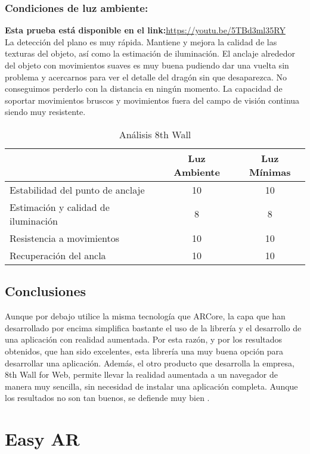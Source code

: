 \subsubsection{Condiciones de luz ambiente:}
\textbf{Esta prueba está disponible en el link:}\url{https://youtu.be/5TBd3ml35RY}\\

La detección del plano es muy rápida. Mantiene y mejora la calidad de las texturas del objeto, así como la estimación de iluminación. El anclaje alrededor del objeto con movimientos suaves es muy buena pudiendo dar una vuelta sin problema y acercarnos para ver el detalle del dragón sin que desaparezca. No conseguimos perderlo con la distancia en ningún momento. La capacidad de soportar movimientos bruscos y movimientos fuera del campo de visión continua siendo muy resistente.

\begin{table}[H]
    \centering
      \begin{tabular}{|l|c|c|}
    \hline
          & Luz Ambiente & Luz Mínimas \\
         \hline
        Estabilidad del punto de anclaje   &10 &10\\
        \hline
        Estimación y calidad de iluminación  &8 &8 \\
        \hline
        Resistencia a movimientos  &10 &10 \\
        \hline
        Recuperación del ancla  &10 &10 \\
      \hline
    \end{tabular}
    \caption{Análisis 8th Wall}
    \label{tab:T8thWall}
\end{table}
\subsection{Conclusiones}
Aunque por debajo utilice la misma tecnología que ARCore, la capa que han desarrollado por encima simplifica bastante el uso de la librería y el desarrollo de una aplicación con realidad aumentada. Por esta razón, y por los resultados obtenidos, que han sido excelentes, esta librería una muy buena opción para desarrollar una aplicación. Además, el otro producto que desarrolla la empresa, 8th Wall for Web, permite llevar la realidad aumentada a un navegador de manera muy sencilla, sin necesidad de instalar una aplicación completa. Aunque los resultados no son tan buenos, se defiende muy bien \cite{8thWallJini}.
\clearpage
\section{Easy AR}
